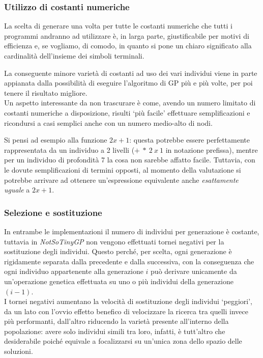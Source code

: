 \documentclass{../llncs}
\begin{document}
\subsubsection{Utilizzo di costanti numeriche}
La scelta di generare una volta per tutte le costanti numeriche che tutti i programmi andranno ad utilizzare è, in larga parte, giustificabile per motivi di efficienza e, se vogliamo, di comodo, in quanto si pone un chiaro significato alla cardinalità dell'insieme dei simboli terminali.

La conseguente minore varietà di costanti ad uso dei vari individui viene in parte appianata dalla possibilità di eseguire l'algoritmo di GP più e più volte, per poi tenere il risultato migliore.\\

Un aspetto interessante da non trascurare è come, avendo un numero limitato di costanti numeriche a disposizione, risulti `più facile' effettuare semplificazioni e ricondursi a casi semplici anche con un numero medio-alto di nodi.

Si pensi ad esempio alla funzione $2x+1$: questa potrebbe essere perfettamente rappresentata da un individuo a 2 livelli ($+\:*\:2\:x\:1$ in notazione prefissa), mentre per un individuo di profondità 7 la cosa non sarebbe affatto facile. Tuttavia, con le dovute semplificazioni di termini opposti, al momento della valutazione si potrebbe arrivare ad ottenere un'espressione equivalente anche \emph{esattamente uguale} a $2x+1$.

\subsubsection{Selezione e sostituzione}
In entrambe le implementazioni il numero di individui per generazione è costante, tuttavia in \emph{NotSoTinyGP} non vengono effettuati tornei negativi per la sostituzione degli individui. Questo perché, per scelta, ogni generazione è rigidamente separata dalla precedente e dalla successiva, con la conseguenza che ogni individuo appartenente alla generazione $i$ può derivare unicamente da un'operazione genetica effettuata su uno o più individui della generazione $(i-1)$.\\

I tornei negativi aumentano la velocità di sostituzione degli individui `peggiori', da un lato con l'ovvio effetto benefico di velocizzare la ricerca tra quelli invece più performanti, dall'altro riducendo la varietà presente all'interno della popolazione: avere solo individui simili tra loro, infatti, è tutt'altro che desiderabile poiché equivale a focalizzarsi su un'unica zona dello spazio delle soluzioni. %
\end{document}
